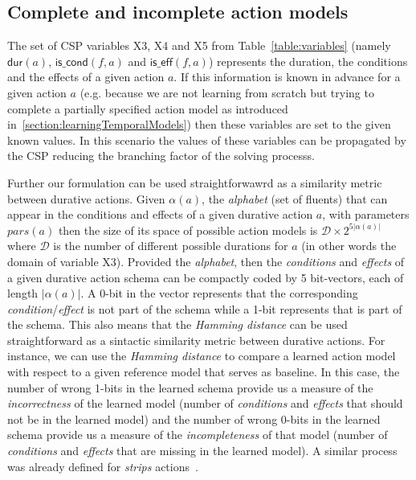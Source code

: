 \documentclass{ecai}
\newcommand{\dur}{\mathsf{dur}}    %
\newcommand{\iscond}{\mathsf{is\_cond}}    %
\newcommand{\iseff}{\mathsf{is\_eff}}    %
\begin{document}
\subsection{Complete and incomplete action models}
The set of CSP variables X3, X4 and X5 from Table~\ref{table:variables} (namely $\dur(a)$, $\iscond(f,a)$ and $\iseff(f,a)$) represents the duration, the conditions and the effects of a given action $a$. If this information is known in advance for a given action $a$ (e.g. because we are not learning from scratch but trying to complete a partially specified action model as introduced in~\ref{section:learningTemporalModels}) then these variables are set to the given known values. In this scenario the values of these variables can be propagated by the CSP reducing the branching factor of the solving processs. 

Further our formulation can be used straightforwawrd as a similarity metric between durative actions. Given $\alpha(a)$, the {\em alphabet} (set of fluents) that can appear in the conditions and effects of a given durative action $a$, with parameters $pars(a)$ then the size of its space of possible action models is $\mathcal{D}\times 2^{5|\alpha(a)|}$ where $\mathcal{D}$ is the number of different possible durations for $a$ (in other words the domain of variable X3). Provided the {\em alphabet}, then the {\em conditions} and {\em effects} of a given durative action schema can be compactly coded by 5 bit-vectors, each of length $|\alpha(a)|$. A 0-bit in the vector represents that the corresponding {\em condition}/{\em effect} is not part of the schema while a 1-bit represents that is part of the schema. This also means that the {\em Hamming distance} can be used straightforward as a sintactic similarity metric between durative actions. For instance, we can use the {\em Hamming distance} to compare a learned action model with respect to a given reference model that serves as baseline. In this case, the number of wrong 1-bits in the learned schema provide us a measure of the {\em incorrectness} of the learned model (number of {\em conditions} and {\em effects} that should not be in the learned model) and the number of wrong 0-bits in the learned schema provide us a measure of the {\em incompleteness} of that model (number of {\em conditions} and {\em effects} that are missing in the learned model). A similar process was already defined for {\em strips} actions~\cite{aineto2019model}. 
\end{document}
